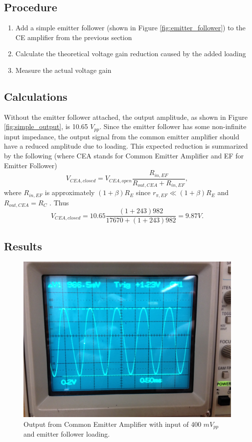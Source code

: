 \documentclass[12pt,letterpaper]{report}
\newlength \figwidth
\begin{document}
\subsection*{Procedure}

\begin{enumerate}
\item Add a simple emitter follower (shown in Figure \ref{fig:emitter_follower}) to the CE amplifier from the previous section
\item Calculate the theoretical voltage gain reduction caused by the added loading
\item Measure the actual voltage gain
\end{enumerate}

\subsection*{Calculations}

Without the emitter follower attached, the output amplitude, as shown in Figure \ref{fig:simple_output}, is 10.65 $V_{pp}$. Since the emitter follower has some non-infinite input impedance, the output signal from the common emitter amplifier should have a reduced amplitude due to loading. This expected reduction is summarized by the following (where CEA stands for Common Emitter Amplifier and EF for Emitter Follower)
$$
V_{CEA,closed} = V_{CEA,open}\frac{R_{in,EF}}{R_{out,CEA}+R_{in,EF}},
$$
where $R_{in,EF}$ is approximately $(1+\beta)R_E$ since $r_{\pi,EF} \ll (1+\beta)R_E$ and $R_{out,CEA} = R_C$ . Thus
$$
V_{CEA,closed} = 10.65 \frac{(1+243)982}{17670+(1+243)982} = 9.87 V.
$$


\subsection*{Results}

\begin{figure}[H]
\centering
\includegraphics[width=\figwidth, keepaspectratio=true]{lab6_images/loading_output.jpg}
\caption{Output from Common Emitter Amplifier with input of 400 $mV_{pp}$ and emitter follower loading.}
\label{fig:loading_output}
\end{figure}
\end{document}
